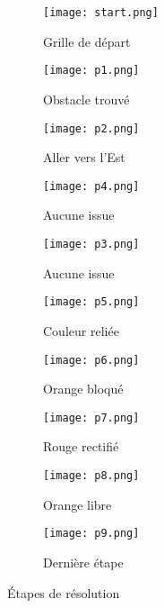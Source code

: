 \begin{figure}[h]
  \centering
  \begin{subfigure}[b]{0.3\textwidth}
      \texttt{[image: start.png]}
      \caption{Grille de départ}
      \label{subfig:start}
   \end{subfigure}
   \begin{subfigure}[b]{0.3\textwidth}
      \texttt{[image: p1.png]}
      \caption{Obstacle trouvé}
      \label{subfig:p1}
   \end{subfigure}
   \begin{subfigure}[b]{0.3\textwidth}
      \texttt{[image: p2.png]}
      \caption{Aller vers l'Est}
      \label{subfig:p2}
   \end{subfigure}
   \begin{subfigure}[b]{0.3\textwidth}
      \texttt{[image: p4.png]}
      \caption{Aucune issue}
      \label{subfig:p4}
   \end{subfigure}
   \begin{subfigure}[b]{0.3\textwidth}
      \texttt{[image: p3.png]}
      \caption{Aucune issue}
      \label{subfig:p3}
   \end{subfigure}
   \begin{subfigure}[b]{0.3\textwidth}
      \texttt{[image: p5.png]}
      \caption{Couleur reliée}
      \label{subfig:p5}
   \end{subfigure}
   \begin{subfigure}[b]{0.3\textwidth}
      \texttt{[image: p6.png]}
      \caption{Orange bloqué}
      \label{subfig:p6}
   \end{subfigure}
   \begin{subfigure}[b]{0.3\textwidth}
      \texttt{[image: p7.png]}
      \caption{Rouge rectifié}
      \label{subfig:p7}
   \end{subfigure}
   \begin{subfigure}[b]{0.3\textwidth}
      \texttt{[image: p8.png]}
      \caption{Orange libre}
      \label{subfig:p8}
   \end{subfigure}
   \begin{subfigure}[b]{0.3\textwidth}
      \texttt{[image: p9.png]}
      \caption{Dernière étape}
      \label{subfig:p9}
   \end{subfigure}
   \label{fig:etapes}
   \caption{Étapes de résolution}
\end{figure}


